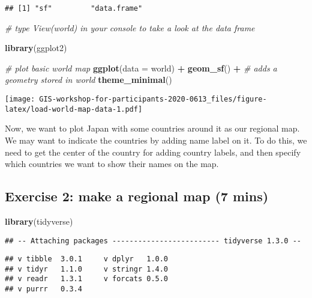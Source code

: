 \documentclass[
  xelatex,ja=standard]{bxjsarticle}
\newenvironment{Shaded}{\begin{snugshade}}{\end{snugshade}}
\newcommand{\CommentTok}[1]{\textcolor[rgb]{0.56,0.35,0.01}{\textit{#1}}}
\newcommand{\DataTypeTok}[1]{\textcolor[rgb]{0.13,0.29,0.53}{#1}}
\newcommand{\KeywordTok}[1]{\textcolor[rgb]{0.13,0.29,0.53}{\textbf{#1}}}
\newcommand{\NormalTok}[1]{#1}
\newcommand{\OperatorTok}[1]{\textcolor[rgb]{0.81,0.36,0.00}{\textbf{#1}}}
\newcommand{\StringTok}[1]{\textcolor[rgb]{0.31,0.60,0.02}{#1}}
\begin{document}
\begin{verbatim}
## [1] "sf"         "data.frame"
\end{verbatim}

\begin{Shaded}
\begin{Highlighting}[]
\CommentTok{# type View(world) in your console to take a look at the data frame}

\KeywordTok{library}\NormalTok{(ggplot2)}

\CommentTok{# plot basic world map }
\KeywordTok{ggplot}\NormalTok{(}\DataTypeTok{data =}\NormalTok{ world) }\OperatorTok{+}
\StringTok{  }\KeywordTok{geom_sf}\NormalTok{() }\OperatorTok{+}\StringTok{ }\CommentTok{# adds a geometry stored in world}
\StringTok{  }\KeywordTok{theme_minimal}\NormalTok{()}
\end{Highlighting}
\end{Shaded}

\texttt{[image: GIS-workshop-for-participants-2020-0613\_files/figure-latex/load-world-map-data-1.pdf]}

Now, we want to plot Japan with some countries around it as our regional
map. We may want to indicate the countries by adding name label on it.
To do this, we need to get the center of the country for adding country
labels, and then specify which countries we want to show their names on
the map.

\hypertarget{exercise-2-make-a-regional-map-7-mins}{%
\subsection{Exercise 2: make a regional map (7
mins)}\label{exercise-2-make-a-regional-map-7-mins}}

\begin{Shaded}
\begin{Highlighting}[]
\KeywordTok{library}\NormalTok{(tidyverse)}
\end{Highlighting}
\end{Shaded}

\begin{verbatim}
## -- Attaching packages ------------------------- tidyverse 1.3.0 --
\end{verbatim}

\begin{verbatim}
## v tibble  3.0.1     v dplyr   1.0.0
## v tidyr   1.1.0     v stringr 1.4.0
## v readr   1.3.1     v forcats 0.5.0
## v purrr   0.3.4
\end{verbatim}
\end{document}

